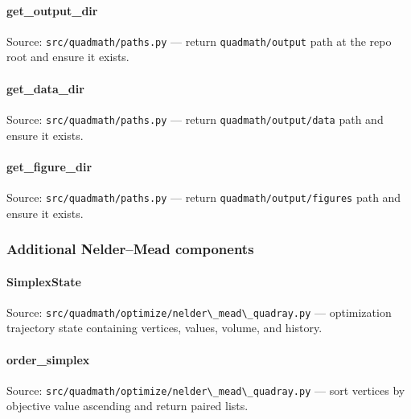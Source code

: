 \documentclass[
  10pt,
]{article}
\newcommand{\passthrough}[1]{#1}
\renewcommand{\texttt}[1]{%
    \colorbox{codebg}{\color{codefg}\ttfamily #1}%
}
\begin{document}
\paragraph{\texorpdfstring{\texttt{get\_output\_dir}}{get\_output\_dir}}\label{code:get_output_dir}

Source: \passthrough{\lstinline!src/quadmath/paths.py!} --- return
\passthrough{\lstinline!quadmath/output!} path at the repo root and
ensure it exists.

\paragraph{\texorpdfstring{\texttt{get\_data\_dir}}{get\_data\_dir}}\label{code:get_data_dir}

Source: \passthrough{\lstinline!src/quadmath/paths.py!} --- return
\passthrough{\lstinline!quadmath/output/data!} path and ensure it
exists.

\paragraph{\texorpdfstring{\texttt{get\_figure\_dir}}{get\_figure\_dir}}\label{code:get_figure_dir}

Source: \passthrough{\lstinline!src/quadmath/paths.py!} --- return
\passthrough{\lstinline!quadmath/output/figures!} path and ensure it
exists.

\subsubsection{Additional Nelder--Mead
components}\label{code:nelder_mead_components}

\paragraph{\texorpdfstring{\texttt{SimplexState}}{SimplexState}}\label{code:SimplexState}

Source:
\passthrough{\lstinline!src/quadmath/optimize/nelder\_mead\_quadray.py!}
--- optimization trajectory state containing vertices, values, volume,
and history.

\paragraph{\texorpdfstring{\texttt{order\_simplex}}{order\_simplex}}\label{code:order_simplex}

Source:
\passthrough{\lstinline!src/quadmath/optimize/nelder\_mead\_quadray.py!}
--- sort vertices by objective value ascending and return paired lists.
\end{document}
